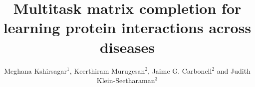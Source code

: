 \documentclass{bioinfo}
\begin{document}


\title[Multitask matrix completion]{Multitask matrix completion for learning protein interactions across diseases}

\author[Kshirsagar \textit{et~al}.]{Meghana Kshirsagar$^{1}$, Keerthiram Murugesan$^{2}$, Jaime G. Carbonell$^{2}$ and Judith Klein-Seetharaman$^{3}$}
\address{$^{1}$Memorial Sloan Kettering Cancer Center, 1275 York Ave., NY 10021\\
$^{2}$Language Technologies Institute, Carnegie Mellon Univ., 5000 Forbes Ave., Pittsburgh PA 15213, USA\\
$^{3}$Metabolic \& Vascular Health, Warwick Medical School, Univ. of Warwick, Coventry, UK
}





\maketitle
\end{document}
